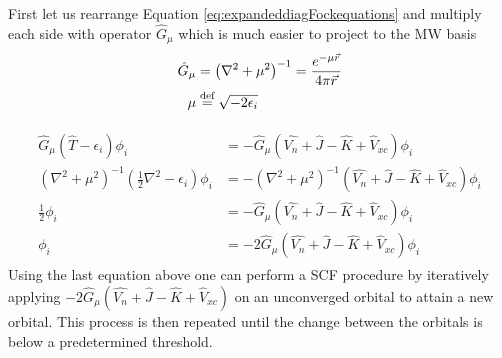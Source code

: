 \documentclass[../master_thesis.tex]{subfiles}
\begin{document}
First let us rearrange Equation \ref{eq:expandeddiagFockequations} and multiply each
side with operator $\hat{G}_\mu$ which is much easier to project to the \ac{MW}
basis
\begin{align}
  \hat{G}_\mu &=\left(\nabla^2 + \mu^2\right)^{-1} = \frac{e^{-\mu\vec{r}}}{4\pi\vec{r}} \\
  \mu &\stackrel{\text{def}}{=} \sqrt{-2\epsilon_i}
\end{align}

\begin{align}
  \begin{split}
    \hat{G}_\mu\left(\hat{T} - \epsilon_i\right)\phi_i &= -\hat{G}_\mu\left(\hat{V_n} + \hat{J} - \hat{K} + \hat{V}_{xc}\right)\phi_i\\
    \left(\nabla^2 + \mu^2\right)^{-1}\left(\frac{1}{2}\nabla^2 - \epsilon_i\right)\phi_i &= -\left(\nabla^2 + \mu^2\right)^{-1}\left(\hat{V_n} + \hat{J} - \hat{K} + \hat{V}_{xc}\right)\phi_i\\
    \frac{1}{2}\phi_i &= -\hat{G}_\mu\left(\hat{V_n} + \hat{J} - \hat{K} + \hat{V}_{xc}\right)\phi_i\\
    \phi_i &= -2\hat{G}_\mu\left(\hat{V_n} + \hat{J} - \hat{K} + \hat{V}_{xc}\right)\phi_i
  \end{split}
\end{align}
Using the last equation above one can perform a \ac{SCF} procedure by iteratively applying
$-2\hat{G}_\mu\left(\hat{V_n} + \hat{J} - \hat{K} + \hat{V}_{xc}\right)$ on an
unconverged orbital to attain a new orbital. This process is then repeated until
the change between the orbitals is below a predetermined threshold.


\biblio
\end{document}
